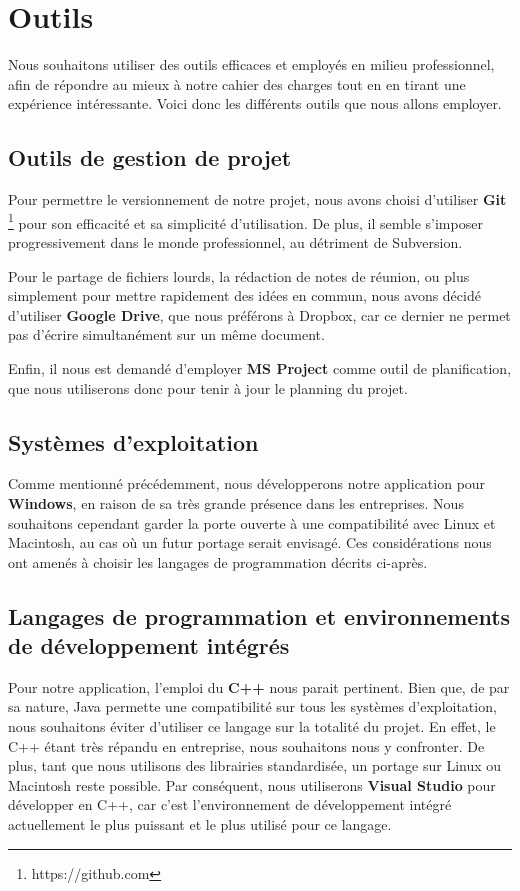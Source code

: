 \section{Outils}
    \label{sec:outils}
    	Nous souhaitons utiliser des outils efficaces et employés en milieu professionnel, afin de répondre au mieux à notre cahier des charges tout en en tirant une expérience intéressante. Voici donc les différents outils que nous allons employer.
         
    \subsection{Outils de gestion de projet}
        Pour permettre le versionnement de notre projet, nous avons choisi d'utiliser {\bf Git} \footnote{https://github.com} pour son efficacité et sa simplicité d'utilisation. De plus, il semble s'imposer progressivement dans le monde professionnel, au détriment de Subversion.
        
        Pour le partage de fichiers lourds, la rédaction de notes de réunion, ou plus simplement pour mettre rapidement des idées en commun, nous avons décidé d'utiliser {\bf Google Drive}, que nous préférons à Dropbox, car ce dernier ne permet pas d'écrire simultanément sur un même document.

        Enfin, il nous est demandé d'employer {\bf MS Project} comme outil de planification, que nous utiliserons donc pour tenir à jour le planning du projet.

	\subsection{Systèmes d'exploitation}
	   Comme mentionné précédemment, nous développerons notre application pour {\bf Windows}, en raison de sa très grande présence dans les entreprises. Nous souhaitons cependant garder la porte ouverte à une compatibilité avec Linux et Macintosh, au cas où un futur portage serait envisagé. Ces considérations nous ont amenés à choisir les langages de programmation décrits ci-après.
	
    \subsection{Langages de programmation et environnements de développement intégrés}
        Pour notre application, l'emploi du {\bf C++} nous parait pertinent. Bien que, de par sa nature, Java permette une compatibilité sur tous les systèmes d'exploitation, nous souhaitons éviter d'utiliser ce langage sur la totalité du projet. En effet, le C++ étant très répandu en entreprise, nous souhaitons nous y confronter. De plus, tant que nous utilisons des librairies standardisée, un portage sur Linux ou Macintosh reste possible. Par conséquent, nous utiliserons {\bf Visual Studio} pour développer en C++, car c'est l'environnement de développement intégré actuellement le plus puissant et le plus utilisé  pour ce langage.
        
